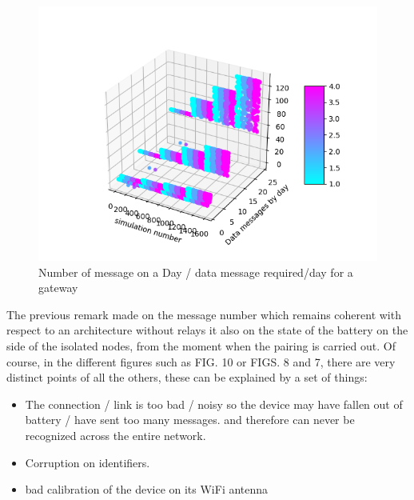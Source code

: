 \documentclass[conference]{IEEEtran}
\begin{document}
\begin{figure}[htbp]
\centerline{\includegraphics[scale=0.5]{graphics_resultats/msg/Sim-MSG_GW-MSG_SEND-degree_GW.png}}
\caption{Number of message on a Day / data message required/day for a gateway}
\label{A}
\end{figure}
The previous remark made on the message number which remains coherent with respect to an architecture without relays it also on the state of the battery on the side of the isolated nodes, from the moment when the pairing is carried out.
Of course, in the different figures such as FIG. 10 or FIGS. 8 and 7, there are very distinct points of all the others, these can be explained by a set of things:
\begin {itemize}
\item The connection / link is too bad / noisy so the device may have fallen out of battery / have sent too many messages. and therefore can never be recognized across the entire network.
\item Corruption on identifiers.
\item bad calibration of the device on its WiFi antenna
\end {itemize}
\end{document}
